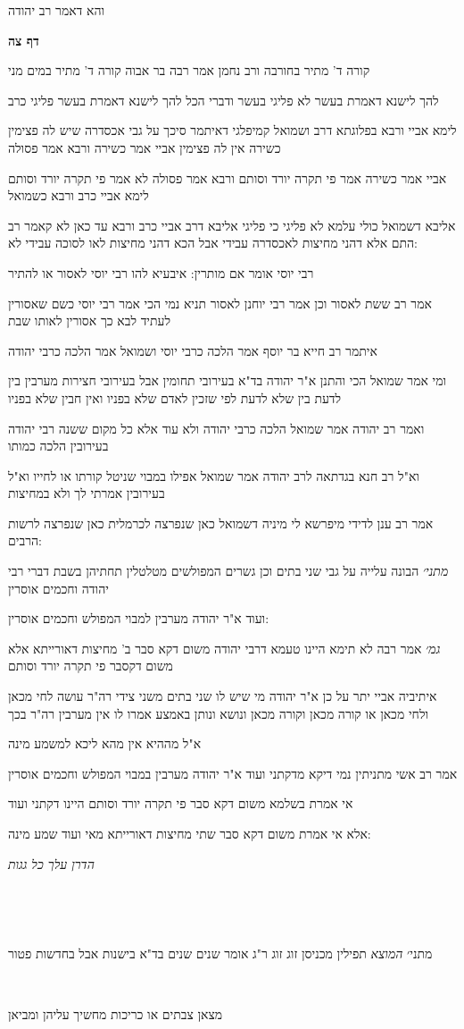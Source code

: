 \documentclass[12pt, openany]{book}
\newcommand{\sethebfont}{
\fontsize{10.5pt}{21.0pt} \selectfont
}
\newcommand{\textblock}[1]{
{\sethebfont #1\\}	
}
\newcommand{\sectname}{}
\newcommand{\newsection}[1]{
	\addcontentsline{toc}{section}{#1}
	\renewcommand{\sectname}{#1}	
	\vspace{-\baselineskip}
	\begin{center}
		\textbf{%
\fontsize{16pt}{16pt}\selectfont
			#1}
	\end{center}
	\vspace{-\baselineskip}
	\nopagebreak
}
\begin{document}
\textblock{והא דאמר רב יהודה}
\newsection{דף צה}
\textblock{קורה ד' מתיר בחורבה ורב נחמן אמר רבה בר אבוה קורה ד' מתיר במים מני}
\textblock{להך לישנא דאמרת בעשר לא פליגי בעשר ודברי הכל להך לישנא דאמרת בעשר פליגי כרב}
\textblock{לימא אביי ורבא בפלוגתא דרב ושמואל קמיפלגי דאיתמר סיכך על גבי אכסדרה שיש לה פצימין כשירה אין לה פצימין אביי אמר כשירה ורבא אמר פסולה}
\textblock{אביי אמר כשירה אמר פי תקרה יורד וסותם ורבא אמר פסולה לא אמר פי תקרה יורד וסותם לימא אביי כרב ורבא כשמואל}
\textblock{אליבא דשמואל כולי עלמא לא פליגי כי פליגי אליבא דרב אביי כרב ורבא עד כאן לא קאמר רב התם אלא דהני מחיצות לאכסדרה עבידי אבל הכא דהני מחיצות לאו לסוכה עבידי לא:}
\textblock{רבי יוסי אומר אם מותרין: איבעיא להו רבי יוסי לאסור או להתיר}
\textblock{אמר רב ששת לאסור וכן אמר רבי יוחנן לאסור תניא נמי הכי אמר רבי יוסי כשם שאסורין לעתיד לבא כך אסורין לאותו שבת}
\textblock{איתמר רב חייא בר יוסף אמר הלכה כרבי יוסי ושמואל אמר הלכה כרבי יהודה}
\textblock{ומי אמר שמואל הכי והתנן א"ר יהודה בד"א בעירובי תחומין אבל בעירובי חצירות מערבין בין לדעת בין שלא לדעת לפי שזכין לאדם שלא בפניו ואין חבין שלא בפניו}
\textblock{ואמר רב יהודה אמר שמואל הלכה כרבי יהודה ולא עוד אלא כל מקום ששנה רבי יהודה בעירובין הלכה כמותו}
\textblock{וא"ל רב חנא בגדתאה לרב יהודה אמר שמואל אפילו במבוי שניטל קורתו או לחייו וא"ל בעירובין אמרתי לך ולא במחיצות}
\textblock{אמר רב ענן לדידי מיפרשא לי מיניה דשמואל כאן שנפרצה לכרמלית כאן שנפרצה לרשות הרבים:}
\textblock{{\large\emph{מתני׳}} הבונה עלייה על גבי שני בתים וכן גשרים המפולשים מטלטלין תחתיהן בשבת דברי רבי יהודה וחכמים אוסרין}
\textblock{ועוד א"ר יהודה מערבין למבוי המפולש וחכמים אוסרין:}
\textblock{{\large\emph{גמ׳}} אמר רבה לא תימא היינו טעמא דרבי יהודה משום דקא סבר ב' מחיצות דאורייתא אלא משום דקסבר פי תקרה יורד וסותם}
\textblock{איתיביה אביי יתר על כן א"ר יהודה מי שיש לו שני בתים משני צידי רה"ר עושה לחי מכאן ולחי מכאן או קורה מכאן וקורה מכאן ונושא ונותן באמצע אמרו לו אין מערבין רה"ר בכך}
\textblock{א"ל מההיא אין מהא ליכא למשמע מינה}
\textblock{אמר רב אשי מתניתין נמי דיקא מדקתני ועוד א"ר יהודה מערבין במבוי המפולש וחכמים אוסרין}
\textblock{אי אמרת בשלמא משום דקא סבר פי תקרה יורד וסותם היינו דקתני ועוד}
\textblock{אלא אי אמרת משום דקא סבר שתי מחיצות דאורייתא מאי ועוד שמע מינה:}
\textblock{\par \par {\large\emph{הדרן עלך כל גגות}}\par \par }
\textblock{}
\textblock{מתני׳ {\large\emph{המוצא}} תפילין מכניסן זוג זוג ר"ג אומר שנים שנים בד"א בישנות אבל בחדשות פטור}
\textblock{}
\textblock{מצאן צבתים או כריכות מחשיך עליהן ומביאן}
\end{document}
